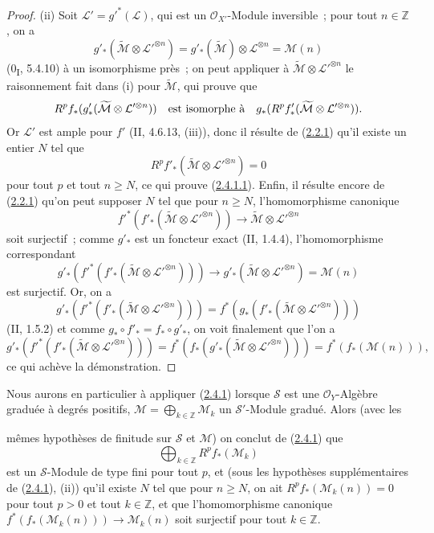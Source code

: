 \begin{proof}
(ii) Soit $\mathcal L'=g'^*(\mathcal L)$, qui est un
$\mathcal O_{X'}$-Module inversible~; pour tout $n\in\mathbb Z$, on a
\[
g'_*(\widetilde{\mathcal M}\otimes\mathcal L'^{\otimes n})
=g'_*(\widetilde{\mathcal M})\otimes\mathcal L^{\otimes n}
=\mathcal M(n)
\]
(0\textsubscript{I}, 5.4.10) à un isomorphisme près~; on peut appliquer
à $\widetilde{\mathcal M}\otimes\mathcal L'^{\otimes n}$ le
raisonnement fait dans (i) pour $\widetilde{\mathcal M}$, qui prouve que
\[
R^pf_*(g'_*(\widetilde{\mathcal M}\otimes\mathcal L'^{\otimes n}))
\quad\hbox{est isomorphe à}\quad
g_*(R^pf'_*(\widetilde{\mathcal M}\otimes\mathcal L'^{\otimes n})).
\]
Or $\mathcal L'$ est ample pour $f'$ (II, 4.6.13, (iii)), donc il résulte
de (\hyperref[III.2.2.1-fr]{2.2.1}) qu'il existe un entier $N$ tel que
\[
R^pf'_*(\widetilde{\mathcal M}\otimes\mathcal L'^{\otimes n})=0
\]
pour tout $p$ et tout $n\geq N$, ce qui prouve
(\hyperref[III.2.4.1.1-fr]{2.4.1.1}). Enfin, il résulte encore de
(\hyperref[III.2.2.1-fr]{2.2.1}) qu'on peut supposer $N$ tel que pour
$n\geq N$, l'homomorphisme canonique
\[
f'^*(f'_*(\widetilde{\mathcal M}\otimes\mathcal L'^{\otimes n}))
\longrightarrow\widetilde{\mathcal M}\otimes\mathcal L'^{\otimes n}
\]
soit surjectif~; comme $g'_*$ est un foncteur exact (II, 1.4.4),
l'homomorphisme correspondant
\[
g'_*(f'^*(f'_*(\widetilde{\mathcal M}\otimes
\mathcal L'^{\otimes n})))
\longrightarrow
g'_*(\widetilde{\mathcal M}\otimes\mathcal L'^{\otimes n})
=\mathcal M(n)
\]
est surjectif. Or, on a
\[
g'_*(f'^*(f'_*(\widetilde{\mathcal M}\otimes
\mathcal L'^{\otimes n})))
=f^*(g_*(f'_*(\widetilde{\mathcal M}\otimes
\mathcal L'^{\otimes n})))
\]
(II, 1.5.2) et comme $g_*\circ f'_* = f_*\circ g'_*$, on voit
finalement que l'on a
\[
g'_*(f'^*(f'_*(\widetilde{\mathcal M}\otimes\mathcal L'^{\otimes n})))
=f^*(f_*(g'_*(\widetilde{\mathcal M}\otimes
\mathcal L'^{\otimes n})))=f^*(f_*(\mathcal M(n))),
\]
ce qui achève la démonstration.
\end{proof}

\begin{env}[2.4.2]
\label{III.2.4.2-fr}
Nous aurons en particulier à appliquer
(\hyperref[III.2.4.1-fr]{2.4.1}) lorsque $\mathcal S$ est une
$\mathcal O_Y$-Algèbre graduée à degrés positifs,
$\mathcal M=\bigoplus_{k\in\mathbb Z}\mathcal M_k$ un
$\mathcal S'$-Module gradué. Alors (avec les

mêmes hypothèses de finitude sur $\mathcal S$ et $\mathcal M$) on conclut
de (\hyperref[III.2.4.1-fr]{2.4.1}) que
\[
\bigoplus_{k\in\mathbb Z}R^pf_*(\mathcal M_k)
\]
est un $\mathcal S$-Module de type fini pour tout $p$, et (sous les
hypothèses supplémentaires de (\hyperref[III.2.4.1-fr]{2.4.1}), (ii))
qu'il existe $N$ tel que pour $n\geq N$, on ait
$R^pf_*(\mathcal M_k(n))=0$ pour tout $p>0$ et tout $k\in\mathbb Z$, et
que l'homomorphisme canonique
$f^*(f_*(\mathcal M_k(n)))\to\mathcal M_k(n)$ soit surjectif pour tout
$k\in\mathbb Z$.
\end{env}

